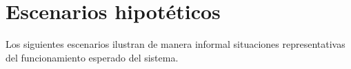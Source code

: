 \documentclass[a4paper, 10pt, twoside]{article}
\begin{document}

\section{Escenarios hipotéticos}

Los siguientes escenarios ilustran de manera informal situaciones representativas del funcionamiento esperado del sistema.
\end{document}
